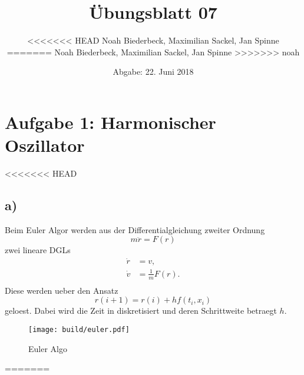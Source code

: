 \documentclass{scrartcl}
\title{Übungsblatt 07}
\author{%
<<<<<<< HEAD
		Noah Biederbeck, Maximilian Sackel, Jan Spinne
=======
  Noah Biederbeck, Maximilian Sackel, Jan Spinne
>>>>>>> noah
}
\date{Abgabe: 22. Juni 2018}
\begin{document}
\maketitle
\section*{Aufgabe 1: Harmonischer Oszillator}
<<<<<<< HEAD
\subsection*{a)}
Beim Euler Algor werden aus der Differentialgleichung zweiter Ordnung
\begin{equation}
		m \ddot{r} = F(r)
\end{equation}
zwei lineare DGLs
\begin{eqnarray}
		\dot{r} &= v,  \\
		\dot{v} &= \frac{1}{m} F(r). \\ 
\end{eqnarray}
Diese werden ueber den Ansatz 
\begin{equation}
		r(i+1) = r(i) + h f(t_i, x_i)
\end{equation}
geloest. Dabei wird die Zeit in diskretisiert und deren Schrittweite 
betraegt $h$.
\begin{figure}[ht]
		\centering
		\texttt{[image: build/euler.pdf]}
		\caption{Euler Algo}
		\label{fig:euler}
\end{figure}
=======
\end{document}
